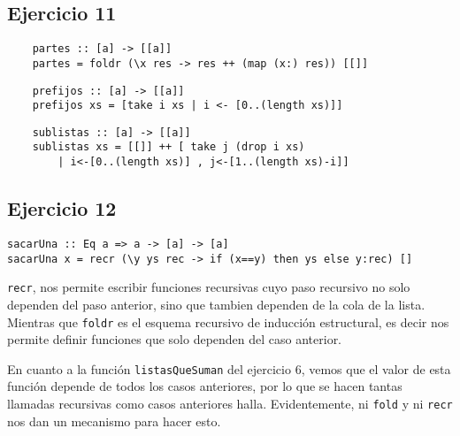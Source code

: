 \subsection{Ejercicio 11}

\begin{centrado}
	\begin{verbatim}
	partes :: [a] -> [[a]]
	partes = foldr (\x res -> res ++ (map (x:) res)) [[]]
	\end{verbatim}
\end{centrado}

\begin{centrado}
	\begin{verbatim}
	prefijos :: [a] -> [[a]]
	prefijos xs = [take i xs | i <- [0..(length xs)]]
	\end{verbatim}
\end{centrado}

\begin{centrado}
	\begin{verbatim}
	sublistas :: [a] -> [[a]]
	sublistas xs = [[]] ++ [ take j (drop i xs)  
		| i<-[0..(length xs)] , j<-[1..(length xs)-i]]
	\end{verbatim}
\end{centrado}


\subsection{Ejercicio 12}
\begin{centrado}
	\begin{verbatim}
sacarUna :: Eq a => a -> [a] -> [a]
sacarUna x = recr (\y ys rec -> if (x==y) then ys else y:rec) []
	\end{verbatim}
\end{centrado}

\texttt{recr}, nos permite escribir funciones recursivas cuyo paso recursivo no solo dependen del paso anterior, sino que tambien dependen de la cola de la lista. Mientras que \texttt{foldr} es el esquema recursivo de inducción estructural, es decir nos permite definir funciones que solo dependen del caso anterior.

En cuanto a la función \texttt{listasQueSuman} del ejercicio 6, vemos que el valor de esta función depende de todos los casos anteriores, por lo que se hacen tantas llamadas recursivas como casos anteriores halla. Evidentemente, ni \texttt{fold} y ni \texttt{recr} nos dan un mecanismo para hacer esto.

